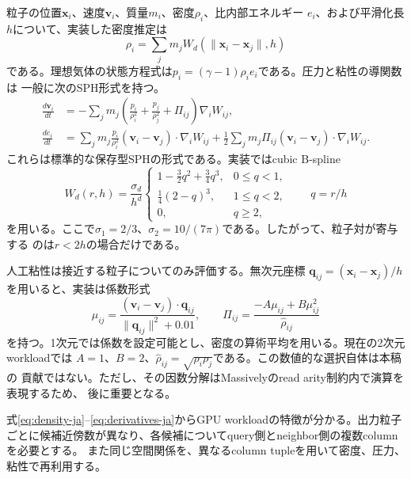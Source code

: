 \documentclass[a4paper,10pt]{ltjsarticle}
\begin{document}
粒子の位置$\mathbf{x}_i$、速度$\mathbf{v}_i$、質量$m_i$、密度$\rho_i$、比内部エネルギー
$e_i$、および平滑化長$h$について、実装した密度推定は
\begin{equation}
  \rho_i = \sum_j m_j W_d(\lVert\mathbf{x}_i-\mathbf{x}_j\rVert,h)
  \label{eq:density-ja}
\end{equation}
である。理想気体の状態方程式は$p_i=(\gamma-1)\rho_i e_i$である。圧力と粘性の導関数は
一般に次のSPH形式を持つ。
\begin{align}
  \frac{d\mathbf{v}_i}{dt}
    &= -\sum_j m_j\left(\frac{p_i}{\rho_i^2}
                       +\frac{p_j}{\rho_j^2}+\Pi_{ij}\right)
       \nabla_i W_{ij}, \\
  \frac{de_i}{dt}
    &= \sum_j m_j\frac{p_i}{\rho_i^2}
       (\mathbf{v}_i-\mathbf{v}_j)\mathbin{\cdot}\nabla_iW_{ij}
       +\frac12\sum_jm_j\Pi_{ij}
       (\mathbf{v}_i-\mathbf{v}_j)\mathbin{\cdot}\nabla_iW_{ij}.
  \label{eq:derivatives-ja}
\end{align}
これらは標準的な保存型SPHの形式である\citep{monaghan2005,price2012}。実装ではcubic
B-spline
\begin{equation}
 W_d(r,h)=\frac{\sigma_d}{h^d}
 \begin{cases}
  1-\tfrac32q^2+\tfrac34q^3,&0\le q<1,\\
  \tfrac14(2-q)^3,&1\le q<2,\\
  0,&q\ge2,
 \end{cases}
 \qquad q=r/h
 \label{eq:kernel-ja}
\end{equation}
を用いる。ここで$\sigma_1=2/3$、$\sigma_2=10/(7\pi)$である。したがって、粒子対が寄与する
のは$r<2h$の場合だけである。

人工粘性は接近する粒子についてのみ評価する。無次元座標
$\mathbf{q}_{ij}=(\mathbf{x}_i-\mathbf{x}_j)/h$を用いると、実装は係数形式
\begin{equation}
 \mu_{ij}=\frac{(\mathbf{v}_i-\mathbf{v}_j)\cdot\mathbf{q}_{ij}}
                 {\lVert\mathbf{q}_{ij}\rVert^2+0.01},\qquad
 \Pi_{ij}=\frac{-A\mu_{ij}+B\mu_{ij}^2}{\widehat\rho_{ij}}
 \label{eq:viscosity-ja}
\end{equation}
を持つ。1次元では係数を設定可能とし、密度の算術平均を用いる。現在の2次元workloadでは
$A=1$、$B=2$、$\widehat\rho_{ij}=\sqrt{\rho_i\rho_j}$である。この数値的な選択自体は本稿の
貢献ではない。ただし、その因数分解はMassivelyのread arity制約内で演算を表現するため、
後に重要となる。

式\eqref{eq:density-ja}--\eqref{eq:derivatives-ja}からGPU workloadの特徴が分かる。出力粒子
ごとに候補近傍数が異なり、各候補についてquery側とneighbor側の複数columnを必要とする。
また同じ空間関係を、異なるcolumn tupleを用いて密度、圧力、粘性で再利用する。
\end{document}
